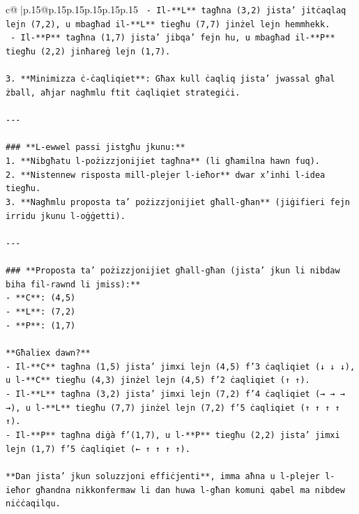 \documentclass{article}
\begin{document}
{\begin{supertabular}{c@{$\;$}|p{.15\linewidth}@{}p{.15\linewidth}p{.15\linewidth}p{.15\linewidth}p{.15\linewidth}p{.15\linewidth}}
{{{\texttt{   {-} Il{-}**L** tagħna (3,2) jista' jitċaqlaq lejn (7,2), u mbagħad il{-}**L** tiegħu (7,7) jinżel lejn hemmhekk.} \\
\texttt{   {-} Il{-}**P** tagħna (1,7) jista' jibqa' fejn hu, u mbagħad il{-}**P** tiegħu (2,2) jinħareġ lejn (1,7).} \\
\\ 
\texttt{3. **Minimizza ċ{-}ċaqliqiet**: Għax kull ċaqliq jista' jwassal għal żball, aħjar nagħmlu ftit ċaqliqiet strategiċi.} \\
\\ 
\texttt{{-}{-}{-}} \\
\\ 
\texttt{\#\#\# **L{-}ewwel passi jistgħu jkunu:**} \\
\texttt{1. **Nibgħatu l{-}pożizzjonijiet tagħna** (li għamilna hawn fuq).} \\
\texttt{2. **Nistennew risposta mill{-}plejer l{-}ieħor** dwar x'inhi l{-}idea tiegħu.} \\
\texttt{3. **Nagħmlu proposta ta' pożizzjonijiet għall{-}għan** (jiġifieri fejn irridu jkunu l{-}oġġetti).} \\
\\ 
\texttt{{-}{-}{-}} \\
\\ 
\texttt{\#\#\# **Proposta ta' pożizzjonijiet għall{-}għan (jista' jkun li nibdaw biha fil{-}rawnd li jmiss):**} \\
\texttt{{-} **C**: (4,5)} \\
\texttt{{-} **L**: (7,2)} \\
\texttt{{-} **P**: (1,7)} \\
\\ 
\texttt{**Għaliex dawn?**} \\
\texttt{{-} Il{-}**C** tagħna (1,5) jista' jimxi lejn (4,5) f'3 ċaqliqiet (↓ ↓ ↓), u l{-}**C** tiegħu (4,3) jinżel lejn (4,5) f'2 ċaqliqiet (↑ ↑).} \\
\texttt{{-} Il{-}**L** tagħna (3,2) jista' jimxi lejn (7,2) f'4 ċaqliqiet (→ → → →), u l{-}**L** tiegħu (7,7) jinżel lejn (7,2) f'5 ċaqliqiet (↑ ↑ ↑ ↑ ↑).} \\
\texttt{{-} Il{-}**P** tagħna diġà f'(1,7), u l{-}**P** tiegħu (2,2) jista' jimxi lejn (1,7) f'5 ċaqliqiet (← ↑ ↑ ↑ ↑).} \\
\\ 
\texttt{**Dan jista' jkun soluzzjoni effiċjenti**, imma aħna u l{-}plejer l{-}ieħor għandna nikkonfermaw li dan huwa l{-}għan komuni qabel ma nibdew niċċaqilqu.} \\
}}}
\end{supertabular}}
\end{document}
